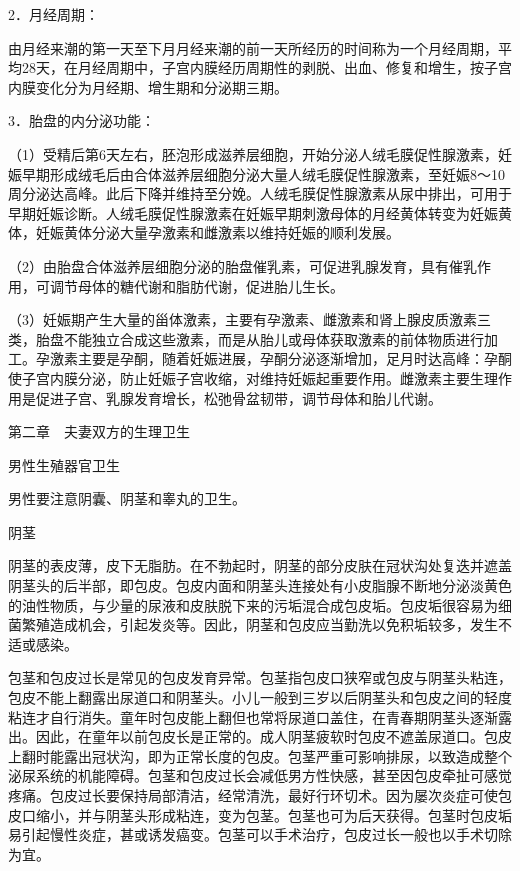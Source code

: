 \documentclass[12pt,UTF8]{ctexbook}
\begin{document}
2．月经周期：

由月经来潮的第一天至下月月经来潮的前一天所经历的时间称为一个月经周期，平均28天，在月经周期中，子宫内膜经历周期性的剥脱、出血、修复和增生，按子宫内膜变化分为月经期、增生期和分泌期三期。

3．胎盘的内分泌功能：

（1）受精后第6天左右，胚泡形成滋养层细胞，开始分泌人绒毛膜促性腺激素，妊娠早期形成绒毛后由合体滋养层细胞分泌大量人绒毛膜促性腺激素，至妊娠8～10周分泌达高峰。此后下降并维持至分娩。人绒毛膜促性腺激素从尿中排出，可用于早期妊娠诊断。人绒毛膜促性腺激素在妊娠早期刺激母体的月经黄体转变为妊娠黄体，妊娠黄体分泌大量孕激素和雌激素以维持妊娠的顺利发展。

（2）由胎盘合体滋养层细胞分泌的胎盘催乳素，可促进乳腺发育，具有催乳作用，可调节母体的糖代谢和脂肪代谢，促进胎儿生长。

（3）妊娠期产生大量的甾体激素，主要有孕激素、雌激素和肾上腺皮质激素三类，胎盘不能独立合成这些激素，而是从胎儿或母体获取激素的前体物质进行加工。孕激素主要是孕酮，随着妊娠进展，孕酮分泌逐渐增加，足月时达高峰：孕酮使子宫内膜分泌，防止妊娠子宫收缩，对维持妊娠起重要作用。雌激素主要生理作用是促进子宫、乳腺发育增长，松弛骨盆韧带，调节母体和胎儿代谢。





第二章　夫妻双方的生理卫生


男性生殖器官卫生


男性要注意阴囊、阴茎和睾丸的卫生。

阴茎

阴茎的表皮薄，皮下无脂肪。在不勃起时，阴茎的部分皮肤在冠状沟处复迭并遮盖阴茎头的后半部，即包皮。包皮内面和阴茎头连接处有小皮脂腺不断地分泌淡黄色的油性物质，与少量的尿液和皮肤脱下来的污垢混合成包皮垢。包皮垢很容易为细菌繁殖造成机会，引起发炎等。因此，阴茎和包皮应当勤洗以免积垢较多，发生不适或感染。

包茎和包皮过长是常见的包皮发育异常。包茎指包皮口狭窄或包皮与阴茎头粘连，包皮不能上翻露出尿道口和阴茎头。小儿一般到三岁以后阴茎头和包皮之间的轻度粘连才自行消失。童年时包皮能上翻但也常将尿道口盖住，在青春期阴茎头逐渐露出。因此，在童年以前包皮长是正常的。成人阴茎疲软时包皮不遮盖尿道口。包皮上翻时能露出冠状沟，即为正常长度的包皮。包茎严重可影响排尿，以致造成整个泌尿系统的机能障碍。包茎和包皮过长会减低男方性快感，甚至因包皮牵扯可感觉疼痛。包皮过长要保持局部清洁，经常清洗，最好行环切术。因为屡次炎症可使包皮口缩小，并与阴茎头形成粘连，变为包茎。包茎也可为后天获得。包茎时包皮垢易引起慢性炎症，甚或诱发癌变。包茎可以手术治疗，包皮过长一般也以手术切除为宜。
\end{document}
